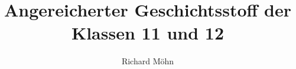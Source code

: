 \documentclass[%
    a4paper,%
    twoside,%
    openright,%
    ngerman,%
    headsepline,%
    headings=normal,
    BCOR=23mm,%
    toc=index,%
    toc=flat,
    draft%
]{scrbook}
\title{Angereicherter Geschichtsstoff der Klassen 11 und 12}
\author{Richard Möhn}
\begin{document}
\thispagestyle{empty}
\thispagestyle{empty}

\maketitle

\frontmatter
\tableofcontents



\mainmatter





\appendix



\backmatter
\begin{flushleft}

\end{flushleft}

\printbibliography[heading=bibintoc]
\nocite{braunesGeschichts}
\nocite{WeltgeschNeuz}
\end{document}
